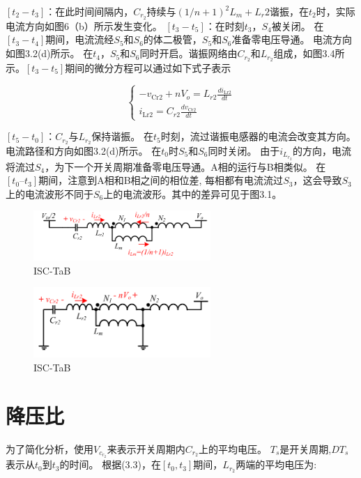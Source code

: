 \documentclass[12pt,a4paper]{report}
\begin{document}
$[t_2-t_3]$：在此时间间隔内，$C_{r_2}$持续与$(1/n+1)^2 L_m+L_r2$谐振，在$t_2$时，实际电流方向如图6（b）所示发生变化。
$[t_3-t_5]$：在时刻$t_3$，$S_4$被关闭。 在$[t_3-t_4]$期间，电流流经$S_5$和$S_6$的体二极管，$S_5$和$S_6$准备零电压导通。 电流方向如图3.2(d)所示。 在$t_4$，$S_5$和$S_6$同时开启。谐振网络由$C_{r_2}$和$L_{r_2}$组成，如图3.4所示。$[t_3-t_5]$期间的微分方程可以通过如下式子表示

\begin{equation}
    \left\{\begin{array}{l}
    -v_{\mathrm{Cr} 2}+n V_{o}=L_{r 2} \frac{d i_{\mathrm{Lr} 2}}{d t} \\
    i_{\mathrm{Lr} 2}=C_{r 2} \frac{d v_{\mathrm{Cr} 2}}{d t}
    \end{array}\right.
\end{equation}

$[t_5-t_0]$：$C_{r_2}$与$L_{r_2}$保持谐振。 在$t_5$时刻，流过谐振电感器的电流会改变其方向。 电流路径和方向如图3.2(d)所示。 在$t_0$时$S_5$和$S_6$同时关闭。 由于$i_{L_{r_2}}$的方向，电流将流过$S_4$，为下一个开关周期准备零电压导通。A相的运行与B相类似。
在$[t_0–t_3]$期间，注意到A相和B相之间的相位差, 每相都有电流流过$S_3$，这会导致$S_3$上的电流波形不同于$S_6$上的电流波形。其中的差异可见于图3.1。
\newline

\begin{figure}[h]
    \centering
    \includegraphics[width = 0.6\textwidth]{figures/current value in t0-t2.png}
    \caption{ISC-TaB}
\end{figure}

\begin{figure}[h]
    \centering
    \includegraphics[width = 0.6\textwidth]{figures/current value in t3-t5.png}
    \caption{ISC-TaB}
\end{figure}

\section{降压比}
为了简化分析，使用$V_{c_{r_2}}$来表示开关周期内$C_{r_2}$上的平均电压。
$T_s$是开关周期,$DT_s$表示从$t_0$到$t_3$的时间。
根据(3.3)，在$[t_0,t_3]$期间，$L_{r_2}$两端的平均电压为:
 
\end{document}
